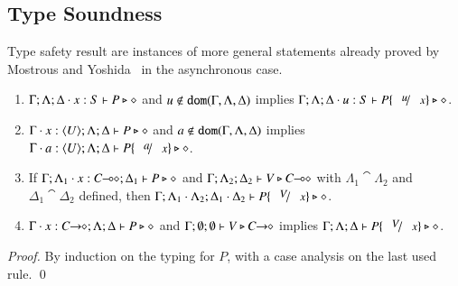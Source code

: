 \subsection{Type Soundness}

Type safety result are instances of more general
statements already proved by
Mostrous and Yoshida~\cite{tlca07,MostrousY15} in the asynchronous case.
%
\begin{lemma}\myrm
	\label{lem:subst}
	\begin{enumerate}[1.]
		\item	$\Gamma; \Lambda; \Delta \cdot x:S  \vdash P \triangleright \diamond$ and
			$u \not\in \mathtt{dom}(\Gamma, \Lambda, \Delta)$
			implies
			$\Gamma; \Lambda; \Delta \cat u:S  \proves P\subst{u}{x} \hastype \Proc$.

		\item	$\Gamma \cdot x:\langle U \rangle; \Lambda; \Delta \vdash P \triangleright \diamond$ and
			$a \notin \mathtt{dom}(\Gamma, \Lambda, \Delta)$
			implies
			$\Gamma \cat a:\chtype{U}; \Lambda; \Delta \proves P\subst{a}{x} \hastype \Proc$.

		\item	If $\Gamma; \Lambda_1 \cdot x:C\!\! \multimap\!\! \diamond; \Delta_1  \vdash P \triangleright \diamond$ 
			and $\Gamma; \Lambda_2; \Delta_2  \vdash V \triangleright C\!\! \multimap\!\! \diamond$ with 
			$\Lambda_1 \cat \Lambda_2$ and $\Delta_1 \cat \Delta_2$ defined,
			then $\Gamma; \Lambda_1 \cat \Lambda_2; \Delta_1 \cat \Delta_2  \proves P\subst{V}{x} \hastype \Proc$.

		\item	$\Gamma \cdot x:C\!\! \rightarrow\!\! \diamond; \Lambda; \Delta  \vdash P \triangleright \diamond$ and
			$\Gamma; \emptyset ; \emptyset \vdash V \triangleright C\!\! \rightarrow\!\! \diamond$
			implies
			$\Gamma; \Lambda; \Delta \proves P\subst{V}{x} \hastype \Proc$.
		\end{enumerate}
\end{lemma}
%
\begin{proof}
	By induction on the typing for $P$, with a case analysis on the last used rule. 
	\qed
\end{proof}

